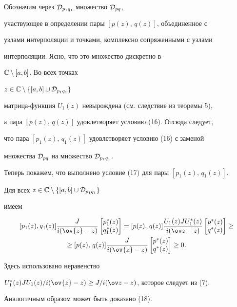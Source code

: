 \begin{pf}


Обозначим через ${\cal D}_{p_1q_1}$ множество ${\cal D}_{pq}$,


участвующее в определении пары $[p(z),\,q(z)]$, объединенное с


узлами интерполяции и точками, комплексно сопряженными с узлами


интерполяции. Ясно, что это множество дискретно в


${\Bbb C}\setminus [a,b]$. Во всех точках


$z\in {\Bbb C}\setminus \{[a,b]\cup {\cal D}_{p_1q_1} \}$


матрица-функция $U_1(z)$ невырождена (см. следствие из теоремы 5),


а пара $[p(z),\,q(z)]$ удовлетворяет условию (16). Отсюда следует,


что пара $[p_1(z),\,q_1(z)]$ удовлетворяет условию (16) с заменой


множества ${\cal D}_{pq}$ на множество ${\cal D}_{p_1q_1}$.





Теперь покажем, что выполнено условие (17) для пары $[p_1(z), \, q_1(z)]$.


Для всех $z\in {\Bbb C}\setminus \{[a,b] \cup {\cal D}_{p_1q_1} \}$


имеем


\begin{multline*}


[p_1(z),q_1(z)] \frac{J}{i(\ov{z}-z)}


\begin{bmatrix} p_1^*(z)\\q_1^*(z)\end{bmatrix}


=[p(z),\, q(z)] \frac{U_1(z)JU_1^*(z)}{i(\ov z -z)}


\begin{bmatrix} p^*(z) \\ q^*(z)\end{bmatrix} \ge \\


%


\geq [p(z),\,q(z)]


\frac{ J }{i(\ov{z}-z)}


\begin{bmatrix} p^*(z) \\ q^*(z)\end{bmatrix} \geq 0.


\end{multline*}


Здесь использовано неравенство


$U_1^*(z) J U_1(z)/i(\ov{z}-z) \geq J/i(\ov z-z)$, которое следует из (7).


Аналогичным образом может быть доказано (18).


\end{pf}






